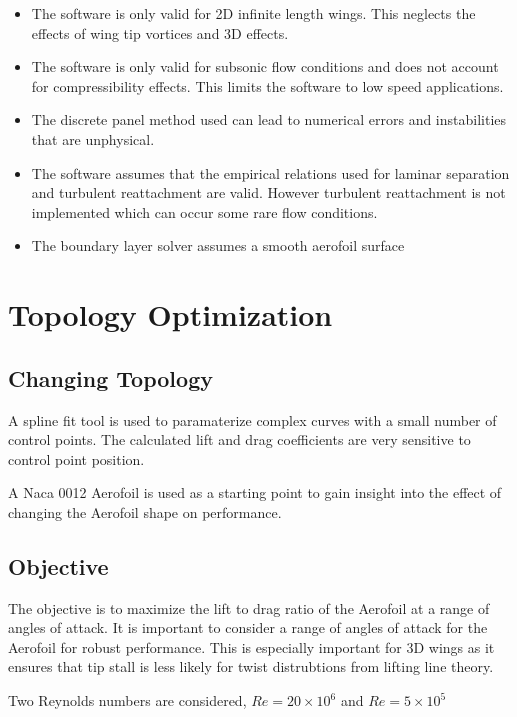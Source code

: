 \documentclass{article}
\begin{document}
\begin{itemize}
    \item The software is only valid for 2D infinite length wings. This neglects the effects of wing tip vortices and 3D effects.
    \item The software is only valid for subsonic flow conditions and does not account for compressibility effects. This limits the software to low speed applications.
    \item The discrete panel method used can lead to numerical errors and instabilities that are unphysical.
    \item The software assumes that the empirical relations used for laminar separation and turbulent reattachment are valid. However turbulent reattachment is not implemented which can occur some rare flow conditions.
    \item The boundary layer solver assumes a smooth aerofoil surface 
\end{itemize}

\section{Topology Optimization}

\subsection{Changing Topology}

A spline fit tool is used to paramaterize complex curves with a small number of control points.
The calculated lift and drag coefficients are very sensitive to control point position.

A Naca 0012 Aerofoil is used as a starting point to gain insight into the effect of changing the Aerofoil shape on performance.

\subsection{Objective}

The objective is to maximize the lift to drag ratio of the Aerofoil at a range of angles of attack.
It is important to consider a range of angles of attack for the Aerofoil for robust performance.
This is especially important for 3D wings as it ensures that tip stall is less likely for twist distrubtions from lifting line theory.

Two Reynolds numbers are considered, $Re = 20\times10^6$ and $Re = 5\times10^5$
\end{document}
